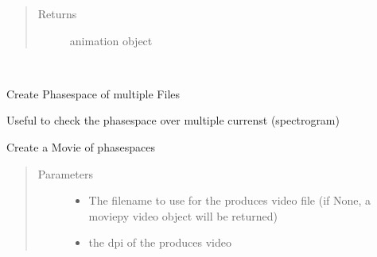 \documentclass[letterpaper,10pt,openany,oneside,english]{sphinxmanual}
\begin{document}
\begin{fulllineitems}
\begin{fulllineitems}
\begin{quote}
\begin{description}
\begin{itemize}
\end{itemize}

\item[{Returns}] \leavevmode
animation object

\end{description}\end{quote}

\end{fulllineitems}


\end{fulllineitems}


\begin{fulllineitems}
\label{\detokenize{plots:plots.MultiPhaseSpaceMovie}}~
\begin{DUlineblock}{0em}
\item[] Create Phasespace of multiple Files  
\item[] Useful to check the phasespace over multiple currenst (spectrogram)  
\end{DUlineblock}

\begin{fulllineitems}
\label{\detokenize{plots:plots.MultiPhaseSpaceMovie.__init__}}
\end{fulllineitems}


\begin{fulllineitems}
\label{\detokenize{plots:plots.MultiPhaseSpaceMovie.create_movie}}
Create a Movie of phasespaces
\begin{quote}\begin{description}
\item[{Parameters}] \leavevmode\begin{itemize}
\item {} 
 \textendash{} The filename to use for the produces video file  
(if None, a moviepy video object will be returned)

\item {} 
\sphinxstyleliteralstrong{(}\sphinxstyleliteralstrong{)} \textendash{} the dpi of the produces video


\end{itemize}
\end{description}
\end{quote}
\end{fulllineitems}
\end{fulllineitems}
\end{document}
